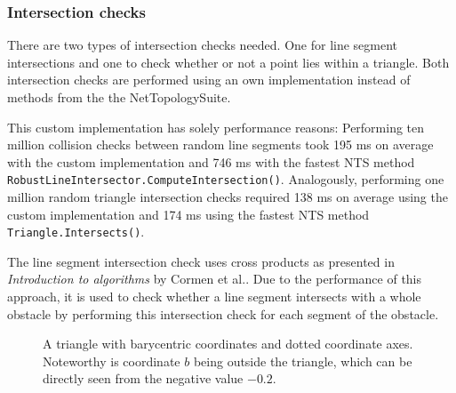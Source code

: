 		\subsubsection{Intersection checks}
		\label{subsubsec:intersection-checks}
			
			There are two types of intersection checks needed.
			One for line segment intersections and one to check whether or not a point lies within a triangle.
			Both intersection checks are performed using an own implementation instead of methods from the the NetTopologySuite.
			
			This custom implementation has solely performance reasons:
			Performing ten million collision checks between random line segments took 195 ms on average with the custom implementation and 746 ms with the fastest NTS method \texttt{RobustLineIntersector.ComputeIntersection()}.
			Analogously, performing one million random triangle intersection checks required 138 ms on average using the custom implementation and 174 ms using the fastest NTS method \texttt{Triangle.Intersects()}.
			
			The line segment intersection check uses cross products as presented in \emph{Introduction to algorithms} by Cormen et al.\cite[1018]{cormen-introduction-to-alg}.
			Due to the performance of this approach, it is used to check whether a line segment intersects with a whole obstacle by performing this intersection check for each segment of the obstacle.
			
			\begin{figure}[h]
				\begin{figcenter}
				\end{figcenter}
				\caption[Example of a barycentric coordinate system.]{A triangle with barycentric coordinates and dotted coordinate axes. Noteworthy is coordinate $b$ being outside the triangle, which can be directly seen from the negative value $-0.2$.}
				\label{fig:barycentric-triangle}
			\end{figure}
			

